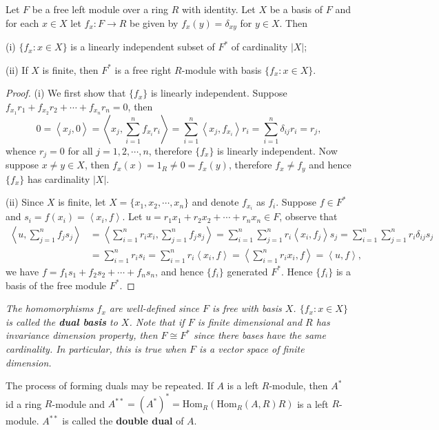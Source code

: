 \begin{theorem}
Let $F$ be a free left module over a ring $R$ with identity. Let $X$ be a basis of $F$ and for each $x\in X$ let $f_x:F\to R$ be given by $f_x(y)=\delta_{xy}$ for $y\in X$. Then \par
(i) $\{f_x:x\in X\}$ is a linearly independent subset of $F^*$ of cardinality $|X|$;\par
(ii) If $X$ is finite, then $F^*$ is a free right $R$-module with basis $\{f_x:x\in X\}$.
\end{theorem}
\begin{proof}
(i) We first show that $\{f_x\}$ is linearly independent. Suppose $f_{x_1}r_1+f_{x_2}r_2+\cdots +f_{x_n}r_n=0$, then 
$$
0=\left< x_j,0 \right> =\left< x_j,\sum_{i=1}^n{f_{x_i}r_i} \right> =\sum_{i=1}^n{\left< x_j,f_{x_i} \right> r_i}=\sum_{i=1}^n{\delta _{ij}r_i}=r_j,
$$
whence $r_j=0$ for all $j=1,2,\cdots,n$, therefore $\{f_x\}$ is linearly independent. Now suppose $x\ne y\in X$, then $f_x(x)=1_R\ne 0=f_x(y)$, therefore $f_x\ne f_y$ and hence $\{f_x\}$ has cardinality $|X|$.\par
(ii) Since $X$ is finite, let $X=\{x_1,x_2,\cdots,x_n\}$ and denote $f_{x_i}$ as $f_i$. Suppose $f\in F^*$ and $s_i=f(x_i)=\left<x_i,f\right>$. Let $u=r_1x_1+r_2x_2+\cdots+r_nx_n\in F$, observe that 
$$
\begin{aligned}
\left< u,\sum_{j=1}^n{f_js_j} \right> &=\left< \sum_{i=1}^n{r_ix_i},\sum_{j=1}^n{f_js_j} \right> =\sum_{i=1}^n{\sum_{j=1}^n{r_i\left< x_i,f_j \right> s_j}}=\sum_{i=1}^n{\sum_{j=1}^n{r_i\delta _{ij}s_j}}
\\
&=\sum_{i=1}^n{r_is_i}=\sum_{i=1}^n{r_i\left< x_i,f \right>}=\left< \sum_{i=1}^n{r_ix_i},f \right> =\left< u,f \right> ,
\end{aligned}
$$
we have $f=f_1s_1+f_2s_2+\cdots+f_ns_n$, and hence $\{f_i\}$ generated $F^*$. Hence $\{f_i\}$ is a basis of the free module $F^*$.
\end{proof}
\begin{note}\em
The homomorphisms $f_x$ are well-defined since $F$ is free with basis $X$. $\{f_x:x\in X\}$ is called the \textbf{dual basis} to $X$. Note that if $F$ is finite dimensional and $R$ has invariance dimension property, then $F\cong F^*$ since there bases have the same cardinality. In particular, this is true when $F$ is a vector space of finite dimension.
\end{note}
The process of forming duals may be repeated. If $A$ is a left $R$-module, then $A^*$ id a ring $R$-module and $A^{**}=(A^*)^*=\mathrm{Hom}_R(\mathrm{Hom}_R(A,R)R)$ is a left $R$-module. $A^{**}$ is called the \textbf{double dual} of $A$. 
